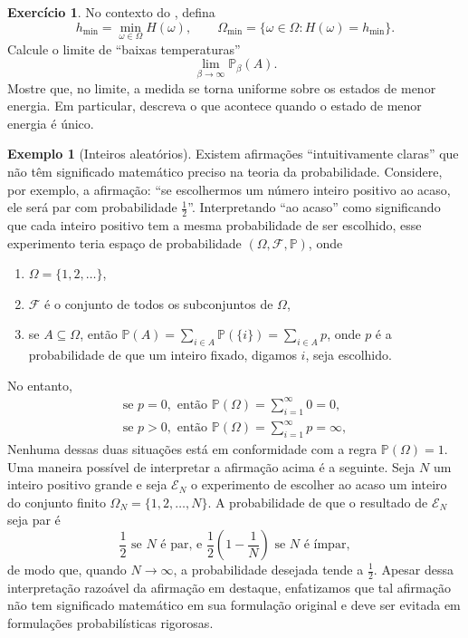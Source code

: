 \documentclass[12pt,portuguese]{article}
\theoremstyle{definition}
\newtheorem{example}[example]{Exemplo}
\newtheorem{exercise}{Exercício}
\begin{document}
\begin{exercise}\label{exercise:gibbs-low-temperature}
  No contexto do , defina
  \[
    h_{\min} = \min_{\omega \in \Omega} H(\omega),
    \qquad
    \Omega_{\min} = \{\omega \in \Omega : H(\omega) = h_{\min}\}.
  \]
  Calcule o limite de ``baixas temperaturas''
  \[
    \lim_{\beta \to \infty} \mathbb{P}_\beta(A).
  \]
  Mostre que, no limite, a medida se torna uniforme sobre os estados de menor
  energia. Em particular, descreva o que acontece quando o estado de menor
  energia é único.
\end{exercise}

\begin{example}[Inteiros aleatórios]\label{ex:1.24}
Existem afirmações ``intuitivamente claras'' que não têm significado
matemático preciso na teoria da probabilidade. Considere, por exemplo, a
afirmação: ``se escolhermos um número inteiro positivo ao acaso, ele será par
com probabilidade \(\tfrac{1}{2}\)''.
Interpretando ``ao acaso'' como significando que cada inteiro positivo tem a
mesma probabilidade de ser escolhido, esse experimento teria espaço de
probabilidade \((\Omega, \mathcal{F}, \mathbb{P})\), onde
\begin{enumerate}[label=(\alph*), ref=\alph*]
\item \(\Omega = \{1, 2, \ldots\}\),
\item \(\mathcal{F}\) é o conjunto de todos os subconjuntos de \(\Omega\),
\item se \(A \subseteq \Omega\), então
\(\mathbb{P}(A) = \sum_{i \in A} \mathbb{P}(\{i\}) = \sum_{i \in A} p\),
onde \(p\) é a probabilidade de que um inteiro fixado, digamos \(i\),
seja escolhido.
\end{enumerate}
No entanto,
\[
\begin{aligned}
\text{se } p = 0, \text{ então } \mathbb{P}(\Omega) =
\sum_{i=1}^{\infty} 0 = 0, \\
\text{se } p > 0, \text{ então } \mathbb{P}(\Omega) =
\sum_{i=1}^{\infty} p = \infty,
\end{aligned}
\]
Nenhuma dessas duas situações está em conformidade com a regra
\(\mathbb{P}(\Omega) = 1\). Uma maneira possível de interpretar a afirmação
acima é a seguinte. Seja \(N\) um inteiro positivo grande e seja \(\mathcal{E}_N\)
o experimento de escolher ao acaso um inteiro do conjunto finito
\(\Omega_N = \{1, 2, \ldots, N\}\). A probabilidade de que o resultado de
\(\mathcal{E}_N\) seja par é
\[
\frac{1}{2} \text{ se } N \text{ é par, e } \frac{1}{2} \left( 1 -
\frac{1}{N} \right) \text{ se } N \text{ é ímpar},
\]
de modo que, quando \(N \to \infty\), a probabilidade desejada tende a
\(\tfrac{1}{2}\). Apesar dessa interpretação razoável da afirmação em
destaque, enfatizamos que tal afirmação não tem significado matemático em sua
formulação original e deve ser evitada em formulações probabilísticas
rigorosas.
\end{example}
\end{document}
